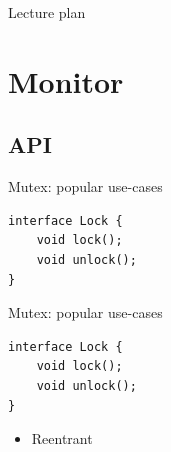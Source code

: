 \begin{frame}{Lecture plan}
\tableofcontents
\end{frame}

%
%
%
%
%
%
%
%

\section{Monitor}

\subsection{API}

\begin{frame}[t,fragile]{Mutex: popular use-cases}

\begin{verbatim}
interface Lock {
    void lock();
    void unlock();
}
\end{verbatim}
\end{frame}


\begin{frame}{Mutex: popular use-cases}

\begin{verbatim}
interface Lock {
    void lock();
    void unlock();
}
\end{verbatim}

\begin{itemize}
    \item Reentrant
\end{itemize}

\end{frame}

